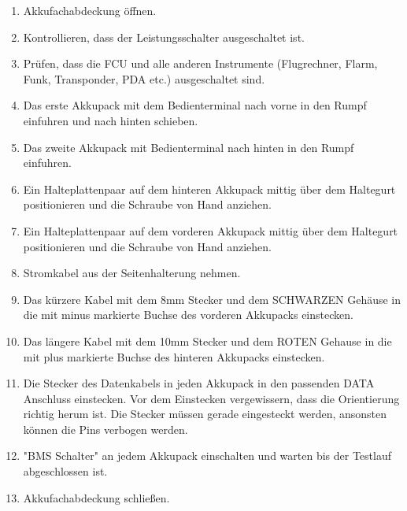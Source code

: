\begin{enumerate}
\item Akkufachabdeckung öffnen.
\item Kontrollieren, dass der Leistungsschalter ausgeschaltet ist.
\item Prüfen, dass die FCU und alle anderen Instrumente (Flugrechner, Flarm, Funk,
Transponder, PDA etc.) ausgeschaltet sind.
\item Das erste Akkupack mit dem Bedienterminal nach vorne in den Rumpf einfuhren und nach hinten schieben.
\item Das zweite Akkupack mit Bedienterminal nach hinten in den Rumpf einfuhren.
\item Ein Halteplattenpaar auf dem hinteren Akkupack mittig über dem Haltegurt positionieren und die Schraube von Hand anziehen.
\item Ein Halteplattenpaar auf dem vorderen Akkupack mittig über dem Haltegurt positionieren und die Schraube von Hand anziehen.
\item Stromkabel aus der Seitenhalterung nehmen.
\item Das kürzere Kabel mit dem 8mm Stecker und dem SCHWARZEN Gehäuse in die mit minus markierte Buchse des vorderen Akkupacks einstecken.
\item Das längere Kabel mit dem 10mm Stecker und dem ROTEN Gehause in die mit plus markierte Buchse des hinteren Akkupacks einstecken.
\item Die Stecker des Datenkabels in jeden Akkupack in den passenden DATA Anschluss einstecken.
Vor dem Einstecken vergewissern, dass die Orientierung richtig herum ist.
Die Stecker müssen gerade eingesteckt werden, ansonsten können die Pins verbogen werden.
\item "BMS Schalter" an jedem Akkupack einschalten und warten bis der Testlauf abgeschlossen ist.
\item Akkufachabdeckung schließen.
\end{enumerate}

